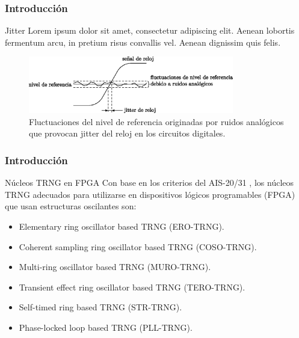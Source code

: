 \documentclass[10pt]{beamer}
\begin{document}
\begin{frame}
    \frametitle{Introducción}
    \begin{block}{Jitter}
        \justifying
         Lorem ipsum dolor sit amet, consectetur adipiscing elit. Aenean lobortis fermentum arcu, in pretium risus convallis vel. Aenean dignissim quis felis.
	\end{block}
    \begin{figure}[hbtp]
        \centering
        \includegraphics[width=0.8\textwidth]{F10_fluctuaciones}
        \caption{Fluctuaciones del nivel de referencia originadas por ruidos analógicos que provocan jitter del reloj en los circuitos digitales. \cite{Petura2019}}
        \label{fig:F10_fluctuaciones}
    \end{figure}
\end{frame}



\begin{frame}
    \frametitle{Introducción}
    \begin{block}{Núcleos TRNG en FPGA}
        \justifying
        Con base en los criterios del AIS-20/31 \cite{Petura2016}, los núcleos TRNG adecuados para utilizarse en dispositivos lógicos programables (FPGA) que usan estructuras oscilantes son:
		\begin{itemize}
            \item Elementary ring oscillator based TRNG (ERO-TRNG).
            \item Coherent sampling ring oscillator based TRNG (COSO-TRNG).
            \item Multi-ring oscillator based TRNG (MURO-TRNG).
            \item Transient effect ring oscillator based TRNG (TERO-TRNG).
            \item Self-timed ring based TRNG  (STR-TRNG).
            \item Phase-locked loop based TRNG (PLL-TRNG).
        \end{itemize}  
	\end{block}
\end{frame}
\end{document}

